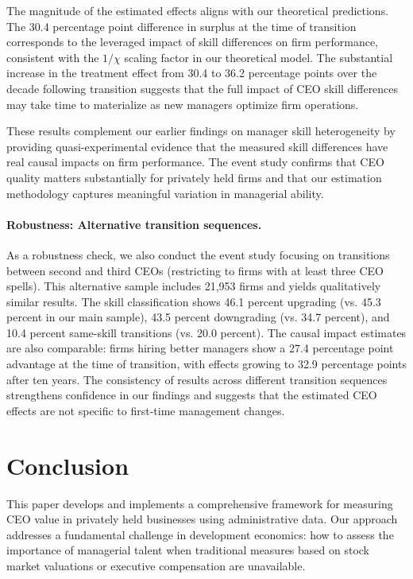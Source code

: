 \documentclass[11pt,a4paper]{article}
\begin{document}
The magnitude of the estimated effects aligns with our theoretical predictions. The 30.4 percentage point difference in surplus at the time of transition corresponds to the leveraged impact of skill differences on firm performance, consistent with the $1/\chi$ scaling factor in our theoretical model. The substantial increase in the treatment effect from 30.4 to 36.2 percentage points over the decade following transition suggests that the full impact of CEO skill differences may take time to materialize as new managers optimize firm operations.

These results complement our earlier findings on manager skill heterogeneity by providing quasi-experimental evidence that the measured skill differences have real causal impacts on firm performance. The event study confirms that CEO quality matters substantially for privately held firms and that our estimation methodology captures meaningful variation in managerial ability.

\paragraph{Robustness: Alternative transition sequences.} As a robustness check, we also conduct the event study focusing on transitions between second and third CEOs (restricting to firms with at least three CEO spells). This alternative sample includes 21,953 firms and yields qualitatively similar results. The skill classification shows 46.1 percent upgrading (vs. 45.3 percent in our main sample), 43.5 percent downgrading (vs. 34.7 percent), and 10.4 percent same-skill transitions (vs. 20.0 percent). The causal impact estimates are also comparable: firms hiring better managers show a 27.4 percentage point advantage at the time of transition, with effects growing to 32.9 percentage points after ten years. The consistency of results across different transition sequences strengthens confidence in our findings and suggests that the estimated CEO effects are not specific to first-time management changes. 

\section{Conclusion}

This paper develops and implements a comprehensive framework for measuring CEO value in privately held businesses using administrative data. Our approach addresses a fundamental challenge in development economics: how to assess the importance of managerial talent when traditional measures based on stock market valuations or executive compensation are unavailable.
\end{document}
